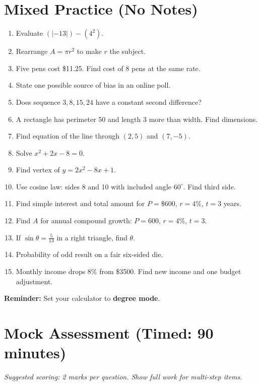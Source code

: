 \documentclass[12pt,oneside]{article}
\newcommand{\ws}[1]{\vspace*{#1}}
\newcommand{\degmode}{\textbf{Reminder:} Set your calculator to \textbf{degree mode}.}
\begin{document}
\section{Mixed Practice (No Notes)}
\begin{enumerate}
  \item Evaluate $(|-13|)-(4^2)$. \ws{1.4cm}
  \item Rearrange $A=\pi r^2$ to make $r$ the subject. \ws{1.6cm}
  \item Five pens cost \$11.25. Find cost of 8 pens at the same rate. \ws{1.7cm}
  \item State one possible source of bias in an online poll. \ws{1.8cm}
  \item Does sequence $3,8,15,24$ have a constant second difference? \ws{1.6cm}
  \item A rectangle has perimeter 50 and length 3 more than width. Find dimensions. \ws{2.0cm}
  \item Find equation of the line through $(2,5)$ and $(7,-5)$. \ws{1.8cm}
  \item Solve $x^2+2x-8=0$. \ws{1.6cm}
  \item Find vertex of $y=2x^2-8x+1$. \ws{1.9cm}
  \item Use cosine law: sides 8 and 10 with included angle $60^\circ$. Find third side. \ws{2.0cm}
  \item Find simple interest and total amount for $P=\$600$, $r=4\%$, $t=3$ years. \ws{1.8cm}
  \item Find $A$ for annual compound growth: $P=600$, $r=4\%$, $t=3$. \ws{1.8cm}
  \item If $\sin\theta=\frac{5}{13}$ in a right triangle, find $\theta$. \ws{1.6cm}
  \item Probability of odd result on a fair six-sided die. \ws{1.2cm}
  \item Monthly income drops 8\% from \$3500. Find new income and one budget adjustment. \ws{2.0cm}
\end{enumerate}
\degmode

\section{Mock Assessment (Timed: 90 minutes)}
\textit{Suggested scoring: 2 marks per question. Show full work for multi-step items.}
\end{document}

